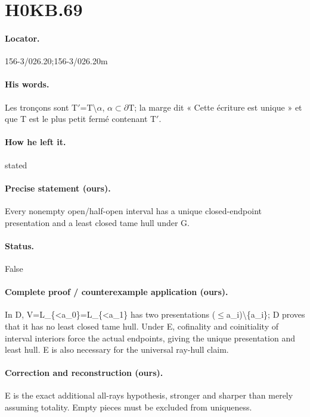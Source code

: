 \section*{H0KB.69}\label{statement:H0KB.69}
\paragraph{Locator.} 156-3/026.20;156-3/026.20m

\paragraph{His words.} Les tronçons sont T\ensuremath{\prime}=T\textbackslash{}\ensuremath{\alpha}, \ensuremath{\alpha}\ensuremath{\subset}\ensuremath{\partial}T; la marge dit « Cette écriture est unique » et que T est le plus petit fermé contenant T\ensuremath{\prime}.

\paragraph{How he left it.} stated

\paragraph{Precise statement (ours).} Every nonempty open/half-open interval has a unique closed-endpoint presentation and a least closed tame hull under G.

\paragraph{Status.} False

\paragraph{Complete proof / counterexample application (ours).} In D, V=L\_\{<a\_0\}=L\_\{<a\_1\} has two presentations (\ensuremath{\leq}a\_i)\textbackslash{}\{a\_i\}; D proves that it has no least closed tame hull. Under E, cofinality and coinitiality of interval interiors force the actual endpoints, giving the unique presentation and least hull. E is also necessary for the universal ray-hull claim.

\paragraph{Correction and reconstruction (ours).} E is the exact additional all-rays hypothesis, stronger and sharper than merely assuming totality. Empty pieces must be excluded from uniqueness.

